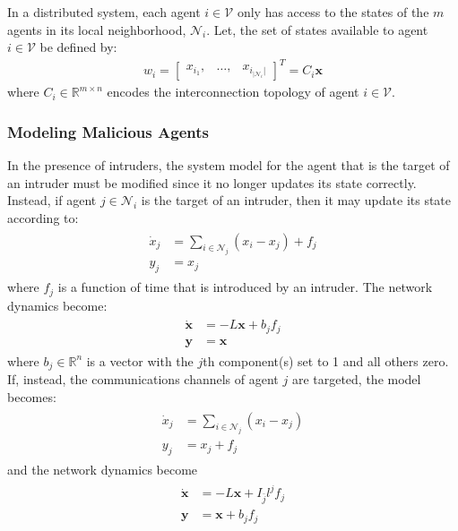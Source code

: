 \documentclass{amsart}
\theoremstyle{definition}
\theoremstyle{remark}
\numberwithin{equation}{section}
\begin{document}
In a distributed system, each agent $i \in \mathcal{V}$ only has access to the states of the $m$ agents in its local neighborhood, $\mathcal{N}_i$. Let, the set of states available to agent $i \in \mathcal{V}$ be defined by:
\begin{align} \label{eq:Ci}
w_i = \left [ \begin{array}{ccc} x_{i_1},&\ldots,&x_{i_{|\mathcal{N}_i}|} \end{array}\right ]^T = C_i \mathbf{x}
\end{align}
where $C_i \in \mathbb{R}^{m \times n}$ encodes the interconnection topology of agent $i \in \mathcal{V}$. 
\subsubsection{Modeling Malicious Agents} In the presence of intruders, the system model for the agent that is the target of an intruder must be modified since it no longer updates its state correctly. Instead, if agent $j \in \mathcal{N}_i$ is the target of an intruder, then it may update its state according to:
\begin{gather} 
\begin{aligned} \label{eq:agentConsFaultAct}
\dot{x}_j &= \sum_{i \in \mathcal{N}_j} (x_i - x_j)+f_j \\
y_j &= x_j
\end{aligned}
\end{gather}
where $f_j$ is a function of time that is introduced by an intruder. The network dynamics become:
\begin{gather} \label{eq:globalDynActFault}
\begin{aligned} 
\dot{\mathbf{x}} &= -L\mathbf{x}+b_j f_j \\
\mathbf{y} &= \mathbf{x} 
\end{aligned}
\end{gather}
where $b_j \in \mathbb{R}^n$ is a vector with the $j$th component(s) set to 1 and all others zero. If, instead, the communications channels of agent $j$ are targeted, the model becomes:
\begin{gather} 
\begin{aligned} \label{eq:agentConsFaultSen}
\dot{x}_j &= \sum_{i \in \mathcal{N}_j} (x_i-x_j) \\
y_j &= x_j + f_{j}
\end{aligned}
\end{gather}
and the network dynamics become
\begin{gather} 
\begin{aligned} 
\dot{\mathbf{x}} &= -L\mathbf{x}+I_{\bar{j}}l^j f_j \\
\mathbf{y} &= \mathbf{x}+b_j f_j
\end{aligned}
\end{gather}
\end{document}
